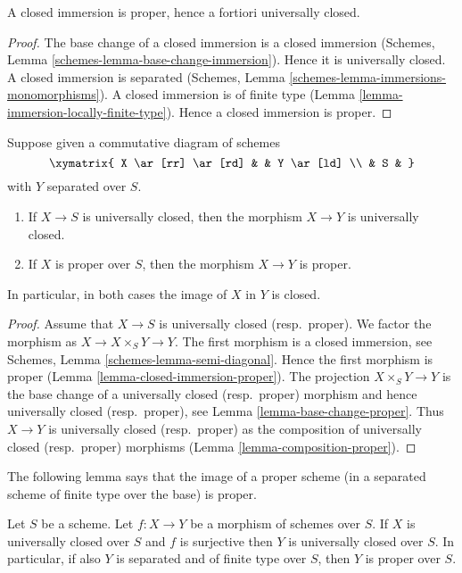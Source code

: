 \begin{lemma}
\label{lemma-closed-immersion-proper}
A closed immersion is proper, hence a fortiori universally closed.
\end{lemma}

\begin{proof}
The base change of a closed immersion is a closed immersion
(Schemes, Lemma \ref{schemes-lemma-base-change-immersion}).
Hence it is universally closed.
A closed immersion is separated
(Schemes, Lemma \ref{schemes-lemma-immersions-monomorphisms}).
A closed immersion is of finite type
(Lemma \ref{lemma-immersion-locally-finite-type}).
Hence a closed immersion is proper.
\end{proof}

\begin{lemma}
\label{lemma-image-proper-scheme-closed}
Suppose given a commutative diagram of schemes
$$
\xymatrix{
X \ar[rr] \ar[rd] & &
Y \ar[ld] \\
& S &
}
$$
with $Y$ separated over $S$.
\begin{enumerate}
\item If $X \to S$ is universally closed, then the morphism
$X \to Y$ is universally closed.
\item If $X$ is proper over $S$, then the morphism $X \to Y$ is proper.
\end{enumerate}
In particular, in both cases the image of $X$ in $Y$ is closed.
\end{lemma}

\begin{proof}
Assume that $X \to S$ is universally closed (resp.\ proper).
We factor the morphism as $X \to X \times_S Y \to Y$.
The first morphism is a closed immersion, see
Schemes, Lemma \ref{schemes-lemma-semi-diagonal}.
Hence the first morphism is proper (Lemma \ref{lemma-closed-immersion-proper}).
The projection $X \times_S Y \to Y$ is the base change
of a universally closed (resp.\ proper) morphism and hence
universally closed (resp.\ proper), see Lemma \ref{lemma-base-change-proper}.
Thus $X \to Y$ is universally closed (resp.\ proper) as the composition
of universally closed (resp.\ proper) morphisms
(Lemma \ref{lemma-composition-proper}).
\end{proof}

\noindent
The following lemma says that the image of a proper scheme (in a separated
scheme of finite type over the base) is proper.

\begin{lemma}
\label{lemma-image-proper-is-proper}
Let $S$ be a scheme.
Let $f : X \to Y$ be a morphism of schemes over $S$.
If $X$ is universally closed over $S$ and $f$ is surjective then
$Y$ is universally closed over $S$. In particular, if also $Y$ is
separated and of finite type over $S$, then $Y$ is proper over $S$.
\end{lemma}

